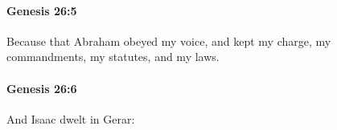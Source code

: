 		\paragraph{Genesis 26:5} %
			\label{GENESIS-26-5}

			Because that Abraham obeyed my voice, and kept my charge, my commandments, my statutes, and my laws.


		\paragraph{Genesis 26:6} %
			\label{GENESIS-26-6}

			And Isaac dwelt in Gerar:


